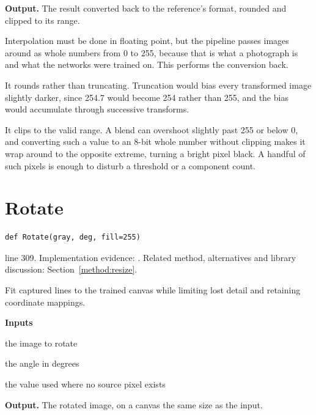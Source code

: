 \noindent\textbf{Output.} The result converted back to the reference's format, rounded and clipped to its range.


Interpolation must be done in floating point, but the pipeline passes images around as whole numbers from 0 to 255, because that is what a photograph is and what the networks were trained on. This performs the conversion back.


It rounds rather than truncating. Truncation would bias every transformed image slightly darker, since 254.7 would become 254 rather than 255, and the bias would accumulate through successive transforms.

It clips to the valid range. A blend can overshoot slightly past 255 or below 0, and converting such a value to an 8-bit whole number without clipping makes it wrap around to the opposite extreme, turning a bright pixel black. A handful of such pixels is enough to disturb a threshold or a component count.



\section{Rotate}\label{fn:segment:Rotate}
\begin{lstlisting}[style=sig]
def Rotate(gray, deg, fill=255)
\end{lstlisting}
 line 309. Implementation evidence: \cite{code2026}. Related method, alternatives and library discussion: Section~\ref{method:resize}.


Fit captured lines to the trained canvas while limiting lost detail and retaining coordinate mappings.




\noindent\textbf{Inputs}
\begin{description}[leftmargin=2.2em,style=nextline,font=\normalfont\ttfamily]\setlength\itemsep{1pt}
  \item[{img}] \normalfont the image to rotate
  \item[{deg}] \normalfont the angle in degrees
  \item[{fill}] \normalfont the value used where no source pixel exists
\end{description}

\noindent\textbf{Output.} The rotated image, on a canvas the same size as the input.


